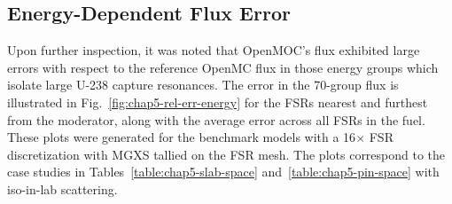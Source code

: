 \subsection{Energy-Dependent Flux Error}
\label{subsec:chap5-diagnosis-energy}

Upon further inspection, it was noted that OpenMOC's flux exhibited large errors with respect to the reference OpenMC flux in those energy groups which isolate large U-238 capture resonances. The error in the 70-group flux is illustrated in Fig.~\ref{fig:chap5-rel-err-energy} for the \ac{FSR}s nearest and furthest from the moderator, along with the average error across all \ac{FSR}s in the fuel. These plots were generated for the benchmark models with a 16$\times$ \ac{FSR} discretization with \ac{MGXS} tallied on the \ac{FSR} mesh. The plots correspond to the case studies in Tables~\ref{table:chap5-slab-space} and~\ref{table:chap5-pin-space} with iso-in-lab scattering.

